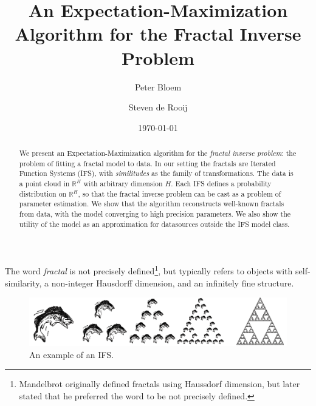 \documentclass[reprint,amsmath,amssymb,aps,prl]{revtex4-1}
\begin{document}

\title{An Expectation-Maximization Algorithm for the Fractal Inverse Problem}

\author{Peter Bloem}

\author{Steven de Rooij}

\date{\today}

\begin{abstract}
\noindent We present an Expectation-Maximization algorithm for the \emph{fractal inverse problem}: the problem of fitting a fractal model to data. In our setting the fractals are Iterated Function Systems (IFS), with \emph{similitudes} as the family of transformations. The data is a point cloud in ${\mathbb R}^H$ with arbitrary dimension $H$. Each IFS defines a probability distribution on ${\mathbb R}^H$, so that the fractal inverse problem can be cast as a problem of parameter estimation. We show that the algorithm reconstructs well-known fractals from data, with the model converging to high precision parameters. We also show the utility of the model as an approximation for datasources outside the IFS model class. 
\end{abstract}

\maketitle


\noindent The word \emph{fractal} is not precisely defined\footnote{Mandelbrot originally defined fractals using Haussdorf dimension, but later stated that he preferred the word to be not precisely defined.}, but typically refers to objects with self-similarity, a non-integer Hausdorff dimension, and an infinitely fine structure. 


\begin{figure}[b]
  \includegraphics[width=\linewidth]{../img/copies.png}
  \caption{An example of an IFS.}
  \label{figure:example}
\end{figure}
\end{document}
